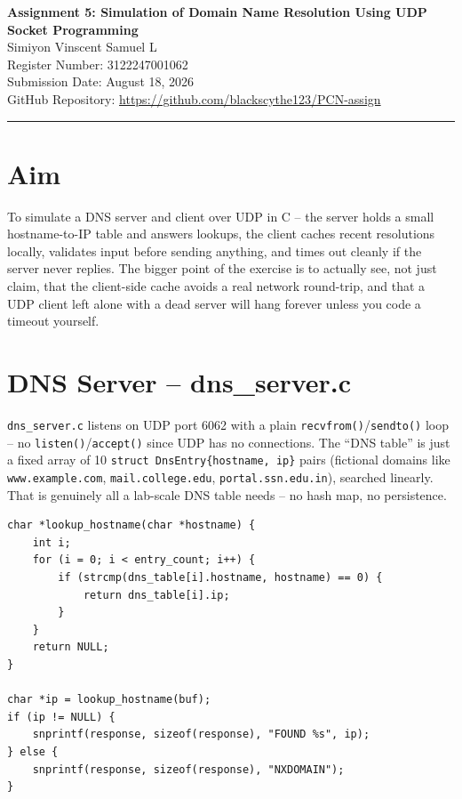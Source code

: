\documentclass[11pt,a4paper]{article}
\begin{document}
\begin{center}
{\LARGE \textbf{Assignment 5: Simulation of Domain Name Resolution Using UDP Socket Programming}}\\[4mm]
Simiyon Vinscent Samuel L\\
Register Number: 3122247001062\\
Submission Date: August 18, 2026\\
GitHub Repository: \url{https://github.com/blackscythe123/PCN-assign}
\end{center}

\vspace{2mm}
\hrule
\vspace{4mm}

\section*{Aim}
To simulate a DNS server and client over UDP in C -- the server holds a small
hostname-to-IP table and answers lookups, the client caches recent resolutions
locally, validates input before sending anything, and times out cleanly if the
server never replies. The bigger point of the exercise is to actually see, not
just claim, that the client-side cache avoids a real network round-trip, and
that a UDP client left alone with a dead server will hang forever unless you
code a timeout yourself.

\section*{DNS Server -- dns\_server.c}
\texttt{dns\_server.c} listens on UDP port 6062 with a plain
\texttt{recvfrom()}/\texttt{sendto()} loop -- no \texttt{listen()}/\texttt{accept()}
since UDP has no connections. The ``DNS table'' is just a fixed array of
10 \texttt{struct DnsEntry\{hostname, ip\}} pairs (fictional domains like
\texttt{www.example.com}, \texttt{mail.college.edu}, \texttt{portal.ssn.edu.in}),
searched linearly. That is genuinely all a lab-scale DNS table needs -- no hash
map, no persistence.

\begin{lstlisting}[caption={dns\_server.c -- table lookup and the FOUND / NXDOMAIN reply}]
char *lookup_hostname(char *hostname) {
    int i;
    for (i = 0; i < entry_count; i++) {
        if (strcmp(dns_table[i].hostname, hostname) == 0) {
            return dns_table[i].ip;
        }
    }
    return NULL;
}

char *ip = lookup_hostname(buf);
if (ip != NULL) {
    snprintf(response, sizeof(response), "FOUND %s", ip);
} else {
    snprintf(response, sizeof(response), "NXDOMAIN");
}
\end{lstlisting}
\end{document}
